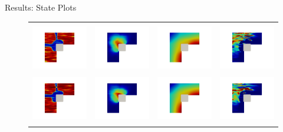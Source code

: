 \documentclass[10pt,xcolor=dvipsnames,compress]{beamer}
\begin{document}
\begin{frame}{Results: State Plots}
\begin{figure}
\begin{tabular}{c c c c}
         \hline \vspace{-0.1in}\\
         \includegraphics[trim={3.6in 1.8in 3.5in 2.5in},clip,width=0.18\linewidth]{Figures/porosity_1.png}&  
         \includegraphics[trim={3.6in 1.8in 3.5in 2.5in},clip,width=0.18\linewidth]{Figures/Disp_1.png}&
         \includegraphics[trim={3.6in 1.8in 3.5in 2.5in},clip,width=0.18\linewidth]{Figures/Tf_1.png}&
         \includegraphics[trim={3.6in 1.8in 3.5in 2.5in},clip,width=0.18\linewidth]{Figures/pressure_1.png}\\
         \hline \vspace{-0.1in}\\
         \includegraphics[trim={3.6in 1.8in 3.5in 2.5in},clip,width=0.18\linewidth]{Figures/porosity_2.png}&  
         \includegraphics[trim={3.6in 1.8in 3.5in 2.5in},clip,width=0.18\linewidth]{Figures/Disp_2.png}&
         \includegraphics[trim={3.6in 1.8in 3.5in 2.5in},clip,width=0.18\linewidth]{Figures/Tf_2.png}&
         \includegraphics[trim={3.6in 1.8in 3.5in 2.5in},clip,width=0.18\linewidth]{Figures/pressure_2.png}\\
         \hline \vspace{-0.1in}\\
         

\end{tabular}
\end{figure}
\end{frame}
\end{document}

